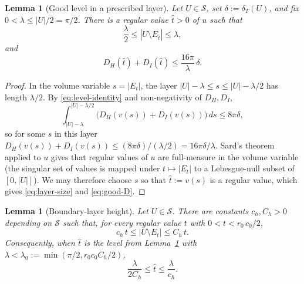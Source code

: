 \documentclass[11pt]{amsart}
\newtheorem{lemma}[theorem]{Lemma}
\newcommand{\dT}{\delta_T}
\newcommand{\Sclass}{\mathcal S}
\begin{document}
\begin{lemma}[Good level in a prescribed layer]\label{lem:good-level}
Let \(U\in\Sclass\), set \(\delta:=\dT(U)\), and fix
\(0<\lambda\le|U|/2=\pi/2\).  There is a regular value \(\hat t>0\)
of \(u\) such that
\begin{equation}\label{eq:layer-size}
   \frac{\lambda}2\le |U\setminus E_{\hat t}|\le \lambda,
\end{equation}
and
\begin{equation}\label{eq:good-D}
   D_H(\hat t)+D_I(\hat t)
      \le \frac{16\pi}{\lambda}\,\delta.
\end{equation}
\end{lemma}

\begin{proof}
In the volume variable \(s=|E_t|\), the layer
\(|U|-\lambda\le s\le|U|-\lambda/2\) has length \(\lambda/2\).  By
\eqref{eq:level-identity} and non-negativity of \(D_H,D_I\),
\[
   \int_{|U|-\lambda}^{|U|-\lambda/2}
      \bigl(D_H(v(s))+D_I(v(s))\bigr)\,ds
   \le 8\pi\delta,
\]
so for some \(s\) in this layer
\(D_H(v(s))+D_I(v(s))\le (8\pi\delta)/(\lambda/2)=16\pi\delta/\lambda\).
Sard's theorem applied to \(u\) gives that regular values of \(u\) are
full-measure in the volume variable (the singular set of values is
mapped under \(t\mapsto |E_t|\) to a Lebesgue-null subset of
\([0,|U|]\)).  We may therefore choose \(s\) so that \(\hat t:=v(s)\) is
a regular value, which gives \eqref{eq:layer-size} and
\eqref{eq:good-D}.
\end{proof}

\begin{lemma}[Boundary-layer height]\label{lem:height}
Let \(U\in\Sclass\).  There are constants \(c_h,C_h>0\) depending on
\(\Sclass\) such that, for every regular value \(t\) with
\(0<t<r_0\,c_0/2\),
\begin{equation}\label{eq:t-layer}
   c_h\,t\le |U\setminus E_t|\le C_h\,t.
\end{equation}
Consequently, when \(\hat t\) is the level from
Lemma~\ref{lem:good-level} with \(\lambda<\lambda_0:=
\min(\pi/2,r_0 c_0 C_h/2)\),
\begin{equation}\label{eq:t-lambda}
   \frac{\lambda}{2C_h}\le \hat t\le \frac{\lambda}{c_h}.
\end{equation}
\end{lemma}
\end{document}
